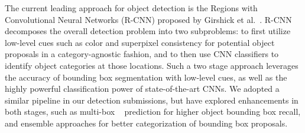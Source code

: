 The current leading approach for object detection is the Regions with Convolutional Neural Networks (R-CNN) proposed by Girshick et al.~\cite{girshick2014rich}. R-CNN decomposes the overall detection problem into two subproblems: to first utilize low-level cues such as color and superpixel consistency for potential object proposals in a category-agnostic fashion, and to then use CNN classifiers to identify object categories at those locations. Such a two stage approach leverages the accuracy of bounding box segmentation with low-level cues, as well as the highly powerful classification power of state-of-the-art CNNs. We adopted a similar pipeline in our detection submissions, but have explored enhancements in both stages, such as multi-box ~\cite{erhan2014scalable} prediction for higher object bounding box recall, and ensemble approaches for better categorization of bounding box proposals.

